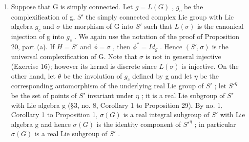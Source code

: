 \begin{enumerate}
\def\labelenumi{(\arabic{enumi})}
\setcounter{enumi}{1}
\tightlist
\item
  Suppose that G is simply connected. Let \(g = L(G)\) , \(g_{c}\) be the complexification of g, \(S'\) the simply connected complex Lie group with Lie algebra \(g_{c}\) and \(\sigma\) the morphism of G into \(S'\) such that \(L(\sigma)\) is the canonical injection of g into \(g_{c}\) . We again use the notation of the proof of Proposition 20, part (a). If \(H = S'\) and \(\phi = \sigma\) , then \(\phi^{*} = I d_{g}\) . Hence \((S', \sigma)\) is the universal complexification of G. Note that \(\sigma\) is not in general injective (Exercise 16); however its kernel is discrete since \(L(\sigma)\) is injective. On the other hand, let \(\theta\) be the involution of \(g_{c}\) defined by g and let \(\eta\) be the corresponding automorphism of the underlying real Lie group of \(S'\) ; let \(S'^{\eta}\) be the set of points of \(S'\) invariant under \(\eta\) ; it is a real Lie subgroup of \(S'\) with Lie algebra g (§3, no. 8, Corollary 1 to Proposition 29). By no. 1, Corollary 1 to Proposition 1, \(\sigma(G)\) is a real integral subgroup of \(S'\) with Lie algebra g and hence \(\sigma(G)\) is the identity component of \(S'^{\eta}\) ; in particular \(\sigma(G)\) is a real Lie subgroup of \(S'\) .
\end{enumerate}

